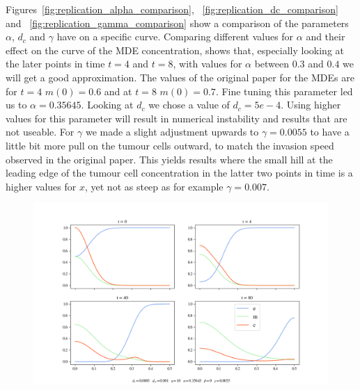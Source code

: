 Figures~\ref{fig:replication_alpha_comparison}, ~\ref{fig:replication_dc_comparison} and ~\ref{fig:replication_gamma_comparison} show a comparison of the parameters $\alpha$, $d_c$ and $\gamma$ have on a specific curve. Comparing different values for $\alpha$ and their effect on the curve of the MDE concentration, shows that, especially looking at the later points in time $t=4$ and $t=8$, with values for $\alpha$ between $0.3$ and $0.4$ we will get a good approximation. The values of the original paper for the MDEs are for $t=4$ $m(0)=0.6$ and at $t=8$ $m(0)=0.7$. Fine tuning this parameter led us to $\alpha=0.35645$.\newline 
Looking at $d_c$ we chose a value of $d_c=5e-4$. Using higher values for this parameter will result in numerical instability and results that are not useable. For $\gamma$ we made a slight adjustment upwards to $\gamma=0.0055$ to have a little bit more pull on the tumour cells outward, to match the invasion speed observed in the original paper. This yields results where the small hill at the leading edge of the tumour cell concentration in the latter two points in time is a higher values for $x$, yet not as steep as for example $\gamma = 0.007$. \newline

\begin{figure}[h]
    \centering
    \includegraphics[width=\textwidth]{resources/images/basecase_without_proliferation.png}
    \label{fig:basecase_without_proliferation}
\end{figure}

